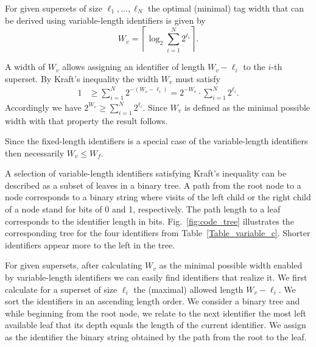 \begin{property}
For given supersets of size $\ell_1, \ldots, \ell_N$ the optimal (minimal) tag width that can be derived using variable-length identifiers is given by 
\begin{equation} \label{eq2}
W_{v}  = \left \lceil \log_2 \sum_{i = 1}^{N}{2^{\ell_i}} \right \rceil. \nonumber 
\end{equation}
\label{property_variable_length_minimal_tag}
\end{property} 
\bp
A width of $W_{v}$ allows assigning an identifier of length  $W_{v} - \ell_i$ to the $i$-th superset. By Kraft's inequality the width  $W_{v}$ must satisfy
\begin{equation} \label{eq1}
\begin{split}
1 &\ge \sum_{i = 1}^{N}{2^{-(W_{v}-\ell_i)}} = 2^{-W_{v}} \cdot \sum_{i = 1}^{N}{2^{\ell_i}}. \nonumber 
\end{split}
\end{equation}
Accordingly we have $2^{W_{v}}  \ge \sum_{i = 1}^{N}{2^{\ell_i}}$. Since $W_{v}$ is defined as the minimal possible width with that property the result follows.
\ep

 
Since the fixed-length identifiers is a special case of the variable-length identifiers then necessarily $W_{v} \le W_{f}$. 

A selection of variable-length identifiers satisfying Kraft's inequality can be described as a subset of leaves in a binary tree. 
A path from the root node to a node corresponds to a binary string where visits of the left child or the right child of a node stand for bits of 0 and 1, respectively. 
The path length  to a leaf corresponds to the identifier length in bits.
Fig.~\ref{fig:code_tree} illustrates the corresponding tree for the four identifiers from Table~\ref{Table_variable_c}. 
Shorter identifiers appear more to the left in the tree.

For given supersets, after calculating $W_{v}$ as the minimal possible width enabled by variable-length identifiers we can easily find identifiers that realize it. We first calculate for a superset of size $\ell_i$ the (maximal) allowed length $W_{v} - \ell_i$. We sort the identifiers in an ascending length order. We consider a binary tree and while beginning from the root node, we relate to the next identifier the most left available leaf that its depth equals the length of the current identifier. We assign as the identifier the binary string obtained by the path from the root to the leaf.
 
